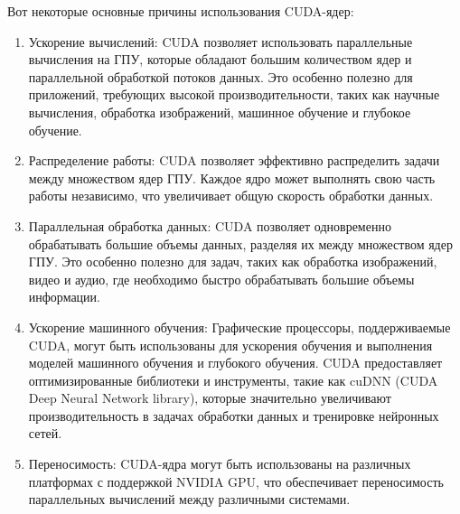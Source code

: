 \documentclass[a4paper, 12pt]{article}
\begin{document}
Вот некоторые основные причины использования CUDA-ядер:
\begin{enumerate}
    \item Ускорение вычислений: CUDA позволяет использовать параллельные вычисления на ГПУ, которые обладают большим количеством ядер и параллельной обработкой потоков данных. Это особенно полезно для приложений, требующих высокой производительности, таких как научные вычисления, обработка изображений, машинное обучение и глубокое обучение.
    \item Распределение работы: CUDA позволяет эффективно распределить задачи между множеством ядер ГПУ. Каждое ядро может выполнять свою часть работы независимо, что увеличивает общую скорость обработки данных.
    \item Параллельная обработка данных: CUDA позволяет одновременно обрабатывать большие объемы данных, разделяя их между множеством ядер ГПУ. Это особенно полезно для задач, таких как обработка изображений, видео и аудио, где необходимо быстро обрабатывать большие объемы информации.
    \item Ускорение машинного обучения: Графические процессоры, поддерживаемые CUDA, могут быть использованы для ускорения обучения и выполнения моделей машинного обучения и глубокого обучения. CUDA предоставляет оптимизированные библиотеки и инструменты, такие как cuDNN (CUDA Deep Neural Network library), которые значительно увеличивают производительность в задачах обработки данных и тренировке нейронных сетей.
    \item Переносимость: CUDA-ядра могут быть использованы на различных платформах с поддержкой NVIDIA GPU, что обеспечивает переносимость параллельных вычислений между различными системами.

\end{enumerate}
\end{document}
